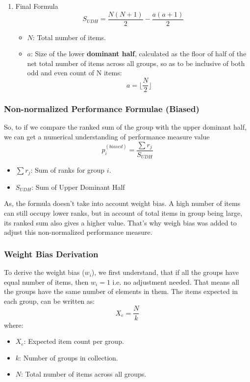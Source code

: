 \documentclass[a4paper,fleqn,review]{cas-sc}
\begin{document}
\begin{enumerate}
\item{Final Formula}
\begin{equation}
\label{eq:SUDH}
S_{UDH} = \frac{N(N + 1)}{2} - \frac{a(a+1)}{2}
\end{equation}

\begin{itemize}
  \item \( N \): Total number of items.
  \item \( a \): Size of the lower \textbf{dominant half}, calculated as the floor of half of the net total number of items across all groups, so as to be inclusive of both odd and even count of N items:
  \begin{equation}
  a = \lfloor \frac{N}{2} \rfloor
  \end{equation}
\end{itemize}
\end{enumerate}

\subsubsection*{Non-normalized Performance Formulae (Biased)}
So, to if we compare the ranked sum of the group with the upper dominant half, we can get a numerical understanding of performance measure value
\begin{equation}
\label{eq:p-biased}
    p_i^{(biased)} = \frac{\sum r_j}{ S_{UDH} }
\end{equation}
\begin{itemize}
    \item \textbf{$\sum r_j$}: Sum of ranks for group $i$.
    \item \textbf{$S_{UDH}$}: Sum of Upper Dominant Half
\end{itemize}

As, the formula doesn't take into account weight bias. A high number of items can still occupy lower ranks, but in account of total items in group being large, its ranked sum also gives a higher value. That's why weigh bias was added to adjust this non-normalized performance measure.

\subsubsection*{Weight Bias Derivation}
To derive the weight bias ($w_i$), we first understand, that if all the groups have equal number of items, then $w_i = 1$ i.e. no adjustment needed. That means all the groups have the same number of elements in them. The items expected in each group, can be written as:
\begin{equation}
X_e = \frac{N}{k}
\end{equation}
where:
\begin{itemize}
    \item $X_e$: Expected item count per group.
    \item $k$: Number of groups in collection.
    \item $N$: Total number of items across all groups.
\end{itemize}
\end{document}
